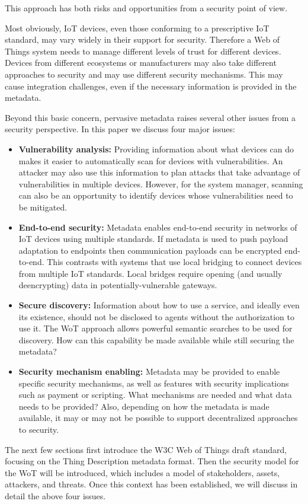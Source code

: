 This approach has both risks and opportunities from a security point of view.

Most obviously, IoT devices, even those conforming to a prescriptive IoT standard,
may vary widely in their support for security.
Therefore a Web of Things system
needs to manage different levels of trust for different devices.
Devices from different ecosystems or manufacturers may also take different approaches to
security and may use different security mechanisms. 
This may cause integration challenges, even if the necessary
information is provided in the metadata.

Beyond this basic concern, pervasive metadata raises several other issues
from a security perspective.
In this paper we discuss four major issues:
\begin{itemize}
\item \textbf{Vulnerability analysis:}
Providing information about what devices can do makes it easier to 
automatically scan for devices with vulnerabilities.
An attacker may also use this information to plan attacks that take advantage of 
vulnerabilities in multiple devices. 
However, for the system manager, scanning can also be an opportunity 
to identify devices whose vulnerabilities need to be mitigated.
\item \textbf{End-to-end security:}
Metadata enables end-to-end security in networks of IoT devices using multiple standards.
If metadata is used to push payload adaptation to endpoints then 
communication payloads can be encrypted end-to-end.  
This contrasts with systems that use local bridging to connect devices from multiple IoT standards.
Local bridges require opening (and usually deencrypting) data in potentially-vulnerable gateways.
\item \textbf{Secure discovery:}
Information about how to use a service, 
and ideally even its existence, should not
be disclosed to agents without the authorization to use it.
The WoT approach allows powerful semantic searches to be used for discovery.
How can this capability be made available while still securing the metadata?
\item \textbf{Security mechanism enabling:}
Metadata may be provided to enable specific security mechanisms,
as well as features with security implications such as payment or scripting.
What mechanisms are needed and what data needs to be provided?
Also, depending on how the metadata is made available, it may or may not be 
possible to support decentralized approaches to security.
\end{itemize}

The next few sections first introduce the W3C Web of Things draft standard,
focusing on the Thing Description metadata format.  
Then the security model for the WoT will be introduced,
which includes a model of stakeholders, assets, attackers, and threats.
Once this context has been established, we will discuss in detail the above
four issues.

